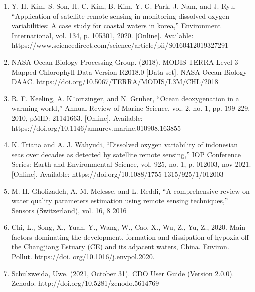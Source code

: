 \begin{enumerate}
    \item Y. H. Kim, S. Son, H.-C. Kim, B. Kim, Y.-G. Park, J. Nam, and J. Ryu, “Application
        of satellite remote sensing in monitoring dissolved oxygen variabilities: A case study for
        coastal waters in korea,” Environment International, vol. 134, p. 105301, 2020. [Online].
        Available: https://www.sciencedirect.com/science/article/pii/S0160412019327291
    \item NASA Ocean Biology Processing Group. (2018). MODIS-TERRA Level 3 Mapped Chlorophyll Data Version R2018.0 [Data set]. NASA Ocean Biology DAAC. https://doi.org/10.5067/TERRA/MODIS/L3M/CHL/2018
    \item R. F. Keeling, A. K¨ortzinger, and N. Gruber, “Ocean deoxygenation in a warming world,”
    Annual Review of Marine Science, vol. 2, no. 1, pp. 199-229, 2010, pMID: 21141663.
    [Online]. Available: https://doi.org/10.1146/annurev.marine.010908.163855
    \item K. Triana and A. J. Wahyudi, “Dissolved oxygen variability of indonesian seas over
    decades as detected by satellite remote sensing,” IOP Conference Series: Earth and
    Environmental Science, vol. 925, no. 1, p. 012003, nov 2021. [Online]. Available:
    https://doi.org/10.1088/1755-1315/925/1/012003
    \item M. H. Gholizadeh, A. M. Melesse, and L. Reddi, “A comprehensive review on water quality
    parameters estimation using remote sensing techniques,” Sensors (Switzerland), vol. 16, 8
    2016
    \item Chi, L., Song, X., Yuan, Y., Wang, W., Cao, X., Wu, Z., Yu, Z., 2020. Main factors 
    dominating the development, formation and dissipation of hypoxia off the 
    Changjiang Estuary (CE) and its adjacent waters, China. Environ. Pollut. https://doi. 
    org/10.1016/j.envpol.2020.
    \item Schulzweida, Uwe. (2021, October 31). CDO User Guide (Version 2.0.0). Zenodo. http://doi.org/10.5281/zenodo.5614769
\end{enumerate}
